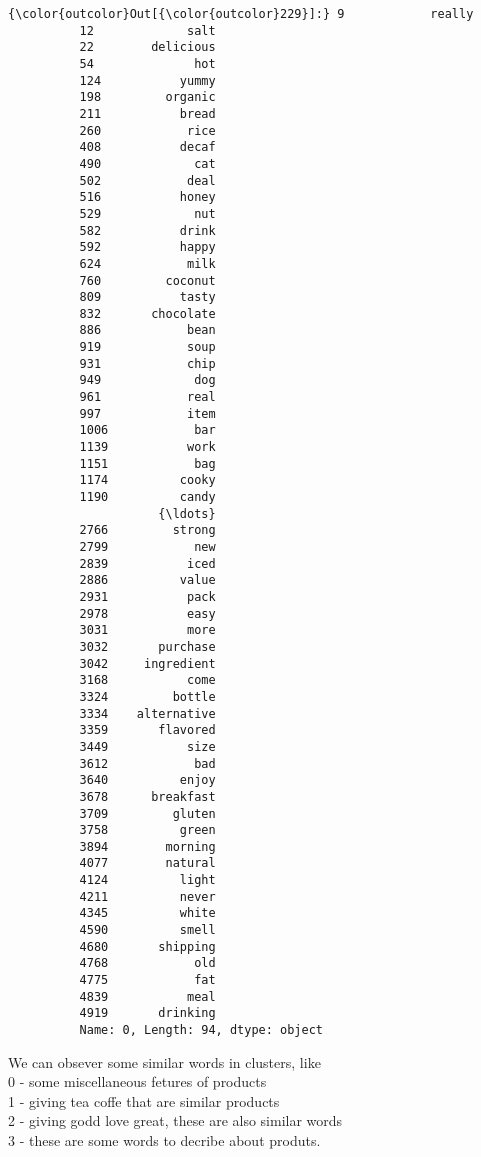 \documentclass[11pt]{article}
\begin{document}
\begin{Verbatim}[commandchars=\\\{\}]
{\color{outcolor}Out[{\color{outcolor}229}]:} 9            really
          12             salt
          22        delicious
          54              hot
          124           yummy
          198         organic
          211           bread
          260            rice
          408           decaf
          490             cat
          502            deal
          516           honey
          529             nut
          582           drink
          592           happy
          624            milk
          760         coconut
          809           tasty
          832       chocolate
          886            bean
          919            soup
          931            chip
          949             dog
          961            real
          997            item
          1006            bar
          1139           work
          1151            bag
          1174          cooky
          1190          candy
                     {\ldots}     
          2766         strong
          2799            new
          2839           iced
          2886          value
          2931           pack
          2978           easy
          3031           more
          3032       purchase
          3042     ingredient
          3168           come
          3324         bottle
          3334    alternative
          3359       flavored
          3449           size
          3612            bad
          3640          enjoy
          3678      breakfast
          3709         gluten
          3758          green
          3894        morning
          4077        natural
          4124          light
          4211          never
          4345          white
          4590          smell
          4680       shipping
          4768            old
          4775            fat
          4839           meal
          4919       drinking
          Name: 0, Length: 94, dtype: object
\end{Verbatim}
            
    We can obsever some similar words in clusters, like\\
0 - some miscellaneous fetures of products\\
1 - giving tea coffe that are similar products\\
2 - giving godd love great, these are also similar words\\
3 - these are some words to decribe about produts.
\end{document}
